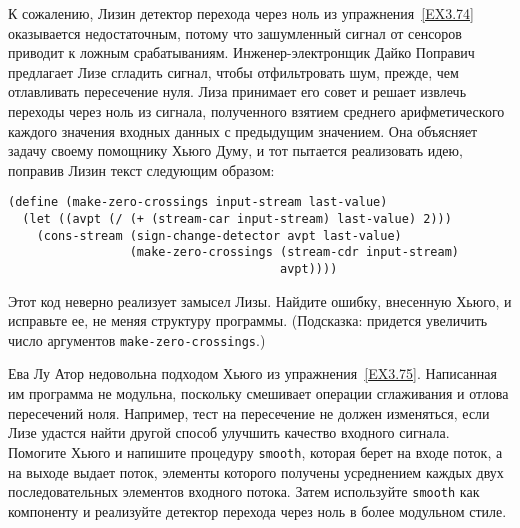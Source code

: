 \begin{exercise}{3.75}\label{EX3.75}%
%
%
%
%
%
К сожалению, Лизин детектор
перехода через ноль из
упражнения~\ref{EX3.74} оказывается недостаточным, потому
что зашумленный сигнал от сенсоров приводит к ложным срабатываниям.
Инженер-электронщик Дайко Поправич предлагает Лизе сгладить сигнал,
чтобы отфильтровать шум, прежде, чем отлавливать пересечение нуля.
Лиза принимает его совет и решает извлечь переходы через ноль из сигнала,
полученного взятием среднего арифметического каждого значения входных
данных с предыдущим значением.  Она объясняет задачу своему помощнику
Хьюго Думу, и тот пытается реализовать идею, поправив Лизин
текст следующим образом:

\begin{Verbatim}[fontsize=\small]
(define (make-zero-crossings input-stream last-value)
  (let ((avpt (/ (+ (stream-car input-stream) last-value) 2)))
    (cons-stream (sign-change-detector avpt last-value)
                 (make-zero-crossings (stream-cdr input-stream)
                                      avpt))))
\end{Verbatim}
Этот код неверно реализует замысел Лизы.  Найдите ошибку, внесенную
Хьюго, и исправьте ее, не меняя структуру программы. (Подсказка:
придется увеличить число аргументов {\tt make-zero-crossings}.)
\end{exercise}
\begin{exercise}{3.76}\label{EX3.76}%
%
%
%
%
Ева Лу Атор недовольна
подходом Хьюго из упражнения~\ref{EX3.75}.  Написанная им программа не модульна,
поскольку смешивает операции сглаживания и отлова пересечений ноля.
Например, тест на пересечение не должен изменяться, если Лизе удастся
найти другой способ улучшить качество входного сигнала.  Помогите Хьюго
и напишите процедуру {\tt smooth}, которая берет на входе
поток, а на выходе выдает поток, элементы которого получены усреднением каждых двух
последовательных элементов входного потока.  Затем используйте
{\tt smooth} как компоненту и реализуйте детектор перехода
через ноль в более модульном стиле.
\end{exercise}

